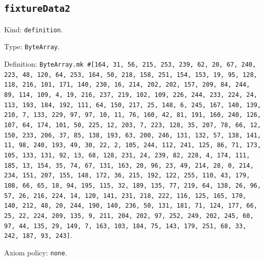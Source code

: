 \documentclass[11pt]{article}
\begin{document}
\subsection*{\texttt{fixtureData2}}
\noindent Kind: \texttt{definition}.\par
\noindent Type: \texttt{ByteArray}.\par
\noindent Definition: \texttt{ByteArray.mk \#[164, 31, 56, 215, 253, 239, 62, 20, 67, 240, 223, 48, 120, 64, 253, 164, 50, 218, 158, 251, 154, 153, 19, 95, 128, 118, 216, 101, 171, 140, 230, 16, 214, 202, 202, 157, 209, 84, 244, 89, 114, 109, 4, 19, 216, 237, 219, 102, 109, 226, 244, 233, 224, 24, 113, 193, 184, 192, 111, 64, 150, 217, 25, 148, 6, 245, 167, 140, 139, 210, 7, 133, 229, 97, 97, 10, 11, 76, 160, 42, 81, 191, 160, 240, 126, 107, 64, 174, 101, 50, 225, 12, 203, 7, 223, 128, 35, 207, 78, 66, 12, 150, 233, 206, 37, 85, 138, 193, 63, 200, 246, 131, 132, 57, 138, 141, 11, 98, 240, 193, 49, 30, 22, 2, 105, 244, 112, 241, 125, 86, 71, 173, 105, 133, 131, 92, 13, 68, 128, 231, 24, 239, 82, 228, 4, 174, 111, 185, 13, 154, 35, 74, 67, 131, 163, 20, 96, 23, 49, 214, 28, 0, 214, 234, 151, 207, 155, 148, 172, 36, 215, 192, 122, 255, 110, 43, 179, 108, 66, 65, 18, 94, 195, 115, 32, 189, 135, 77, 219, 64, 138, 26, 96, 57, 26, 216, 224, 14, 120, 141, 231, 218, 222, 116, 125, 165, 170, 140, 212, 48, 20, 244, 190, 140, 236, 50, 131, 181, 71, 124, 177, 66, 25, 22, 224, 209, 135, 9, 211, 204, 202, 97, 252, 249, 202, 245, 60, 97, 44, 135, 29, 149, 7, 163, 103, 184, 75, 143, 179, 251, 68, 33, 242, 187, 93, 243]}.\par
\noindent Axiom policy: \texttt{none}.\par
\end{document}
